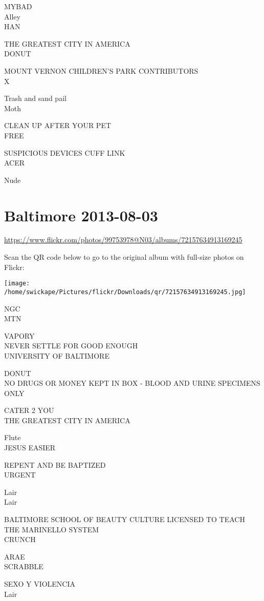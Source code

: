 \documentclass[10pt,letterpaper]{article}
\begin{document}
MYBAD\\
Alley\\
HAN

THE GREATEST CITY IN AMERICA\\
DONUT

MOUNT VERNON CHILDREN'S PARK CONTRIBUTORS\\
X

Trash and sand pail\\
Moth

CLEAN UP AFTER YOUR PET\\
FREE

SUSPICIOUS DEVICES CUFF LINK\\
ACER

Nude


\section*{Baltimore 2013-08-03}

\url{https://www.flickr.com/photos/99753978@N03/albums/72157634913169245}

Scan the QR code below to go to the original album with full-size photos on Flickr:

\texttt{[image: /home/swickape/Pictures/flickr/Downloads/qr/72157634913169245.jpg]}


NGC\\
MTN

VAPORY\\
NEVER SETTLE FOR GOOD ENOUGH\\
UNIVERSITY OF BALTIMORE

DONUT\\
NO DRUGS OR MONEY KEPT IN BOX {-} BLOOD AND URINE SPECIMENS ONLY

CATER 2 YOU\\
THE GREATEST CITY IN AMERICA

Flute\\
JESUS EASIER

REPENT AND BE BAPTIZED\\
URGENT

Lair\\
Lair

BALTIMORE SCHOOL OF BEAUTY CULTURE LICENSED TO TEACH THE MARINELLO SYSTEM\\
CRUNCH

ARAE\\
SCRABBLE

SEXO Y VIOLENCIA\\
Lair
\end{document}
